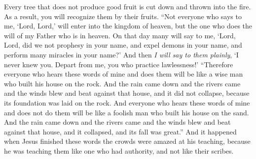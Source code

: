 \begin{biblechapter}
\verse Every tree that does not produce good fruit is cut down and thrown into the fire.
\verse As a result, you will recognize them by their fruits.
 “Not everyone who says to me, ‘Lord, Lord,’ will enter into the kingdom of heaven, but the one who does the will of my Father who is in heaven.
\verse On that day many will say to me, ‘Lord, Lord, did we not prophesy in your name, and expel demons in your name, and perform many miracles in your name?’
\verse And then \textit{I will say to them plainly}, ‘I never knew you. Depart from me, you who practice lawlessness!’
 “Therefore everyone who hears these words of mine and does them will be like a wise man who built his house on the rock.
\verse And the rain came down and the rivers came and the winds blew and beat against that house, and it did not collapse, because its foundation was laid on the rock.
\verse And everyone who hears these words of mine and does not do them will be like a foolish man who built his house on the sand.
\verse And the rain came down and the rivers came and the winds blew and beat against that house, and it collapsed, and its fall was great.”
 And it happened when Jesus finished these words the crowds were amazed at his teaching,
\verse because he was teaching them like one who had authority, and not like their scribes.
\end{biblechapter}

